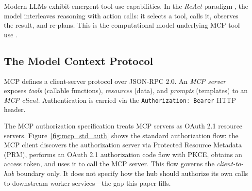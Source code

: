 \documentclass[journal]{IEEEtran}
\begin{document}
Modern LLMs exhibit emergent tool-use capabilities. In the \textit{ReAct}
paradigm \cite{yao2022react}, the model interleaves reasoning with action
calls: it selects a tool, calls it, observes the result, and re-plans. This
is the computational model underlying MCP tool use \cite{wang2024survey}.

\subsection{The Model Context Protocol}

MCP \cite{mcp_spec} defines a client-server protocol over JSON-RPC 2.0. An
\textit{MCP server} exposes \textit{tools} (callable functions), \textit{resources}
(data), and \textit{prompts} (templates) to an \textit{MCP client}. Authentication
is carried via the \texttt{Authorization: Bearer} HTTP header.

The MCP authorization specification \cite{mcp_spec_2025} treats MCP servers as
OAuth 2.1 resource servers. Figure~\ref{fig:mcp_std_auth} shows the standard
authorization flow: the MCP client discovers the authorization server via
Protected Resource Metadata (PRM), performs an OAuth 2.1 authorization code flow
with PKCE, obtains an access token, and uses it to call the MCP server. This flow
governs the \textit{client-to-hub} boundary only. It does not specify how the hub
should authorize its own calls to downstream worker services---the gap this paper
fills.
\end{document}
